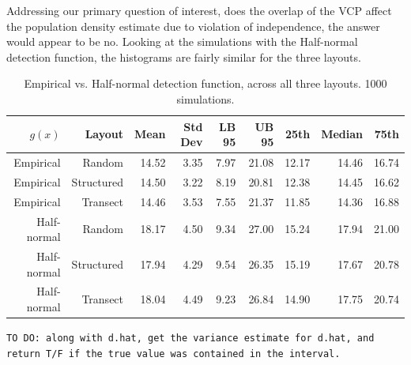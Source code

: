 \documentclass[12pt]{article}
\begin{document}
Addressing our primary question of interest, does the overlap of the VCP affect the population density estimate due to violation of independence, the answer would appear to be no. Looking at the simulations with the Half-normal detection function, the histograms are fairly similar for the three layouts. 

\begin{table}
	\caption{Empirical vs. Half-normal detection function, across all three layouts. 1000 simulations.}
	\begin{tabular}{ r r r r r r r r r}
	   $g(x)$	 & Layout		& Mean	& Std Dev	& LB 95 & UB 95	& 25th	& Median	&  75th \\ \hline \hline
	   Empirical & Random		& 14.52 & 3.35 		& 7.97	& 21.08	& 12.17	& 14.46	& 16.74\\
	   Empirical & Structured	& 14.50 & 3.22 		& 8.19 	& 20.81 & 12.38 & 14.45 & 16.62\\
	   Empirical & Transect		& 14.46 & 3.53 		& 7.55 	& 21.37 & 11.85 & 14.36 & 16.88\\ \hline
	 Half-normal & Random 		& 18.17 & 4.50 		& 9.34 	& 27.00 & 15.24 & 17.94 & 21.00\\
	 Half-normal & Structured	& 17.94 & 4.29 		& 9.54 	& 26.35 & 15.19 & 17.67 & 20.78\\
	 Half-normal & Transect		& 18.04 & 4.49 		& 9.23 	& 26.84 & 14.90 & 17.75 & 20.74\\

	\end{tabular}
	\label{table:sim1}
\end{table}



\texttt{TO DO: along with d.hat, get the variance estimate for d.hat, and return T/F if the true value was contained in the interval.}
\end{document}
